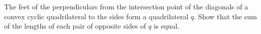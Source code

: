 The feet of the perpendiculars from the intersection point of the diagonals of a convex cyclic quadrilateral to the sides form a quadrilateral $q$. Show that the sum of the lengths of each pair of opposite sides of $q$ is equal.